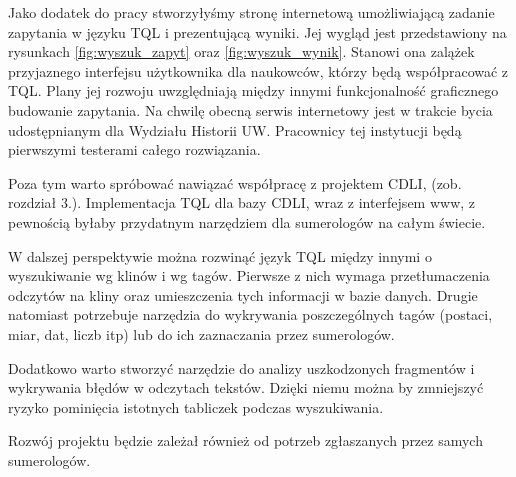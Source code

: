 Jako dodatek do pracy stworzyłyśmy stronę internetową umożliwiającą zadanie zapytania w języku TQL i prezentującą wyniki. 
Jej wygląd jest przedstawiony na rysunkach \ref{fig:wyszuk_zapyt} oraz \ref{fig:wyszuk_wynik}.
Stanowi ona zalążek przyjaznego interfejsu użytkownika dla naukowców, którzy będą współpracować z TQL. Plany jej rozwoju
uwzględniają między innymi funkcjonalność graficznego budowanie zapytania.
Na chwilę obecną serwis internetowy jest w trakcie bycia udostępnianym dla Wydziału Historii UW.
Pracownicy tej instytucji będą pierwszymi testerami całego rozwiązania.

Poza tym warto spróbować nawiązać współpracę z projektem CDLI, (zob. rozdział 3.).
Implementacja TQL dla bazy CDLI, wraz z interfejsem www, z pewnością byłaby przydatnym narzędziem dla sumerologów na całym świecie.

W dalszej perspektywie można rozwinąć język TQL między innymi o wyszukiwanie wg klinów i wg tagów. 
Pierwsze z nich wymaga przetłumaczenia odczytów na kliny oraz umieszczenia tych informacji w bazie danych.
Drugie natomiast potrzebuje narzędzia do wykrywania poszczególnych tagów
(postaci, miar, dat, liczb itp) lub do ich zaznaczania przez sumerologów.

Dodatkowo warto stworzyć narzędzie do analizy uszkodzonych fragmentów i wykrywania błędów w odczytach tekstów. 
Dzięki niemu można by zmniejszyć ryzyko pominięcia istotnych tabliczek podczas wyszukiwania. 

Rozwój projektu będzie zależał również od potrzeb zgłaszanych przez samych sumerologów.
